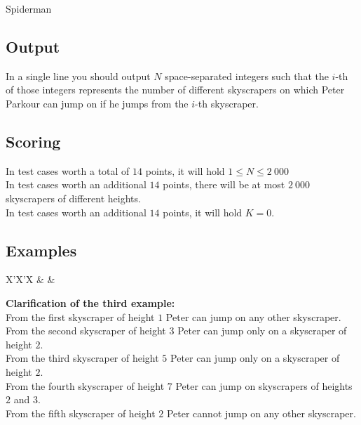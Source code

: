 \begin{statement}[
  problempoints=70,
  timelimit=1 second,
  memorylimit=512 MiB,
]{Spiderman}
\subsection*{Output}
In a single line you should output $N$ space-separated integers such that the
$i$-th of those integers represents the number of different skyscrapers on
which Peter Parkour can jump on if he jumps from the $i$-th skyscraper.

\subsection*{Scoring}
In test cases worth a total of $14$ points, it will hold $1 \le N \le 2\ 000$\\
In test cases worth an additional $14$ points, there will be at most $2\ 000$
skyscrapers of different heights. \\
In test cases worth an additional $14$ points, it will hold $K = 0$.

\subsection*{Examples}
\begin{tabularx}{\textwidth}{X'X'X}
 &
 &
\end{tabularx}

\textbf{Clarification of the third example:}\\
From the first skyscraper of height $1$ Peter can jump on any other skyscraper.\\
From the second skyscraper of height $3$ Peter can jump only on a skyscraper of  height $2$.\\
From the third skyscraper of height $5$ Peter can jump only on a skyscraper of height $2$.\\
From the fourth skyscraper of height $7$ Peter can jump on skyscrapers of heights $2$ and $3$.\\
From the fifth skyscraper of height $2$ Peter cannot jump on any other skyscraper.

\end{statement}

